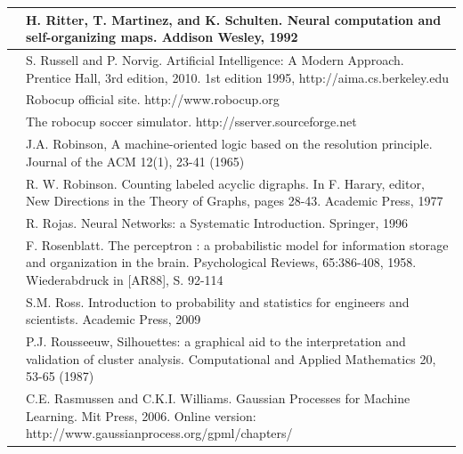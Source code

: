 \documentclass[10pt]{book}
\begin{document}
\begin{tabular}{|l|l|}
\hline [RMS92] & H. Ritter, T. Martinez, and K. Schulten. Neural computation and self-organizing maps. Addison Wesley, 1992 \\
\hline [RN10] & S. Russell and P. Norvig. Artificial Intelligence: A Modern Approach. Prentice Hall, 3rd edition, 2010. 1st edition 1995, http://aima.cs.berkeley.edu \\
\hline [Roba] & Robocup official site. http://www.robocup.org \\
\hline [Robb] & The robocup soccer simulator. http://sserver.sourceforge.net \\
\hline [Rob65] & J.A. Robinson, A machine-oriented logic based on the resolution principle. Journal of the ACM 12(1), 23-41 (1965) \\
\hline [\cite{robinson1977labeleddags}] & R. W. Robinson. Counting labeled acyclic digraphs. In F. Harary, editor, New Directions in the Theory of Graphs, pages 28-43. Academic Press, 1977 \\
\hline [Roj96] & R. Rojas. Neural Networks: a Systematic Introduction. Springer, 1996 \\
\hline [Ros58] & F. Rosenblatt. The perceptron : a probabilistic model for information storage and organization in the brain. Psychological Reviews, 65:386-408, 1958. Wiederabdruck in [AR88], S. 92-114 \\
\hline [Ros09] & S.M. Ross. Introduction to probability and statistics for engineers and scientists. Academic Press, 2009 \\
\hline [Rou87] & P.J. Rousseeuw, Silhouettes: a graphical aid to the interpretation and validation of cluster analysis. Computational and Applied Mathematics 20, 53-65 (1987) \\
\hline [RW06] & C.E. Rasmussen and C.K.I. Williams. Gaussian Processes for Machine Learning. Mit Press, 2006. Online version: http://www.gaussianprocess.org/gpml/chapters/ \\
\hline
\end{tabular}
\end{document}
